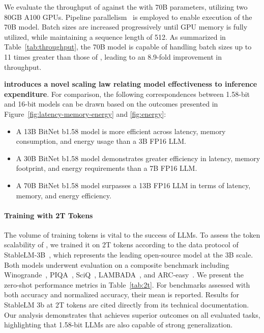 We evaluate the throughput of  against the  with 70B parameters, utilizing two 80GB A100 GPUs. Pipeline parallelism~\cite{gpipe} is employed to enable execution of the  70B model. Batch sizes are increased progressively until GPU memory is fully utilized, while maintaining a sequence length of 512. As summarized in Table~\ref{tab:throughput}, the  70B model is capable of handling batch sizes up to 11 times greater than those of , leading to an 8.9-fold improvement in throughput.

\textbf{ introduces a novel scaling law relating model effectiveness to inference expenditure}. For comparison, the following correspondences between 1.58-bit and 16-bit models can be drawn based on the outcomes presented in Figure~\ref{fig:latency-memory-energy} and \ref{fig:energy}:

\begin{itemize}
    \item A 13B BitNet b1.58 model is more efficient across latency, memory consumption, and energy usage than a 3B FP16 LLM.
    \item A 30B BitNet b1.58 model demonstrates greater efficiency in latency, memory footprint, and energy requirements than a 7B FP16 LLM.
    \item A 70B BitNet b1.58 model surpasses a 13B FP16 LLM in terms of latency, memory, and energy efficiency.
\end{itemize}

\paragraph{Training with 2T Tokens}

The volume of training tokens is vital to the success of LLMs. To assess the token scalability of , we trained it on 2T tokens according to the data protocol of StableLM-3B~\cite{StableLM-3B-4E1T}, which represents the leading open-source model at the 3B scale. Both models underwent evaluation on a composite benchmark including Winogrande~\cite{winoGrande}, PIQA~\cite{piqa}, SciQ~\cite{sciq}, LAMBADA~\cite{lambada}, and ARC-easy~\cite{arc}. We present the zero-shot performance metrics in Table~\ref{tab:2t}. For benchmarks assessed with both accuracy and normalized accuracy, their mean is reported. Results for StableLM 3b at 2T tokens are cited directly from its technical documentation. Our analysis demonstrates that  achieves superior outcomes on all evaluated tasks, highlighting that 1.58-bit LLMs are also capable of strong generalization.

